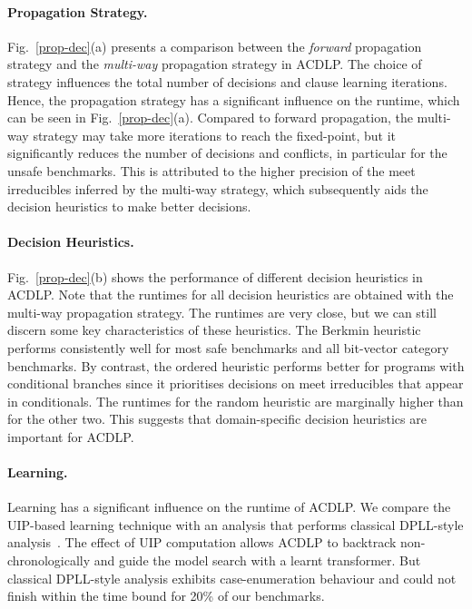 \paragraph{Propagation Strategy.}
%
Fig.~\ref{prop-dec}(a) presents a comparison between the {\em forward}
propagation strategy and the {\em multi-way} propagation strategy in ACDLP.  The
choice of strategy influences the total number of decisions
and clause learning iterations.  Hence, the propagation strategy has a
significant influence on the runtime, which can be seen in
Fig.~\ref{prop-dec}(a).  Compared to forward propagation, the multi-way
strategy may take more iterations to reach the fixed-point, but it
significantly reduces the number of decisions and conflicts, in
particular for the unsafe benchmarks.  This is attributed to the higher
precision of the meet irreducibles inferred by the multi-way strategy, which
subsequently aids the decision heuristics to make better decisions.

\paragraph{Decision Heuristics.}
%
Fig.~\ref{prop-dec}(b) shows the performance of different decision
heuristics in ACDLP.  Note that the runtimes for all decision heuristics are
obtained with the multi-way propagation strategy.  The runtimes are very
close, but we can still discern some key characteristics of these
heuristics.  The Berkmin heuristic performs consistently well for most safe
benchmarks and all bit-vector category benchmarks.  By contrast, the ordered
heuristic performs better for programs with conditional branches since it
prioritises decisions on meet irreducibles that appear in conditionals.  The
runtimes for the random heuristic are marginally higher than for the other
two.  This suggests that domain-specific decision heuristics are important
for ACDLP.
%


\paragraph{Learning.}
%
Learning has a significant influence on the runtime of ACDLP.  We compare
the UIP-based learning technique with an analysis that performs classical 
DPLL-style analysis~\cite{DPLL62}.
The effect of UIP computation allows ACDLP to backtrack non-chronologically 
and guide the model search with a learnt transformer.  But classical 
DPLL-style analysis exhibits case-enumeration behaviour and could not finish 
within the time bound for 20\% of our benchmarks.
%
